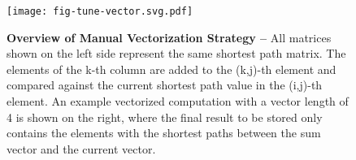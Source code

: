 
\begin{figure}[h]

  \centering
  \texttt{[image: fig-tune-vector.svg.pdf]}

  \caption{\textbf{Overview of Manual Vectorization Strategy --} All
    matrices shown on the left side represent the same shortest path
    matrix. The elements of the k-th column are added to the (k,j)-th
    element and compared against the current shortest path value in the
    (i,j)-th element. An example vectorized computation with a vector
    length of 4 is shown on the right, where the final result to be
    stored only contains the elements with the shortest paths between the
    sum vector and the current vector. }

  \label{fig-tune-vector}

\end{figure}
